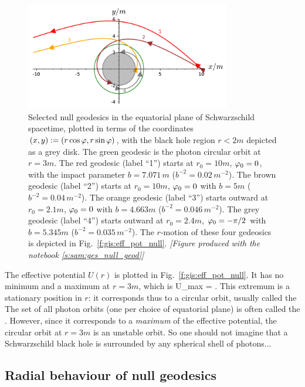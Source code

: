 \begin{figure}
\centerline{\includegraphics[width=0.8\textwidth]{ges_null_geod.pdf}}
\caption[]{\label{f:gis:null_geod} \footnotesize
Selected null geodesics in the equatorial plane of Schwarzschild spacetime,
plotted in terms
of the coordinates $(x,y) := (r\cos\varphi, r\sin\varphi)$, with the black hole
region $r<2m$ depicted as a grey disk.
The green geodesic is the photon circular orbit at $r=3m$.
The red geodesic (label ``1'') starts at $r_0=10 m$, $\varphi_0=0$, with
the impact parameter $b = 7.071 \, m$ ($b^{-2} = 0.02\, m^{-2}$).
The brown geodesic (label ``2'') starts at $r_0=10 m$, $\varphi_0=0$ with $b = 5 m$ ($b^{-2} = 0.04\, m^{-2}$).
The orange geodesic (label ``3'') starts outward at $r_0=2.1 m$, $\varphi_0=0$ with $b = 4.663 m$ ($b^{-2} = 0.046\, m^{-2}$).
The grey geodesic (label ``4'') starts outward at $r_0=2.4 m$, $\varphi_0=-\pi/2$ with $b = 5.345 m$ ($b^{-2} = 0.035\, m^{-2}$).
The $r$-motion of these four gedeosics is depicted in
Fig.~\ref{f:gis:eff_pot_null}. \textsl{[Figure produced with the notebook \ref{s:sam:ges_null_geod}]}}
\end{figure}

The effective potential $U(r)$ is plotted in Fig.~\ref{f:gis:eff_pot_null}.
It has no minimum and a maximum at $r=3m$, which is
\be \label{e:ges:U_max}
    U_{\rm max} =  .
\ee
This extremum is a stationary position in $r$: it corresponds thus to a circular
orbit, usually called the
The set of all photon orbits (one per choice of equatorial plane) is often
called the .
However, since it corresponds to a \emph{maximum} of the effective potential, the circular
orbit at $r=3m$ is an unstable orbit. So one should not imagine that a
Schwarzschild black hole is surrounded by any spherical shell of photons...


\subsection{Radial behaviour of null geodesics} \label{s:gis:null_radial_behav}

